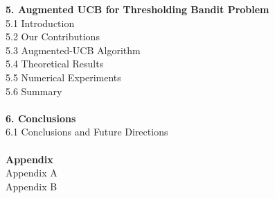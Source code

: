 \textbf{5. Augmented UCB for Thresholding Bandit Problem}\\
5.1 Introduction\\
5.2 Our Contributions\\
5.3 Augmented-UCB Algorithm\\
5.4 Theoretical Results\\
5.5 Numerical Experiments\\
5.6 Summary\\
\\
\textbf{6. Conclusions} \\
6.1 Conclusions and Future Directions \\
\\
\textbf{Appendix}\\
Appendix A\\
Appendix B\\